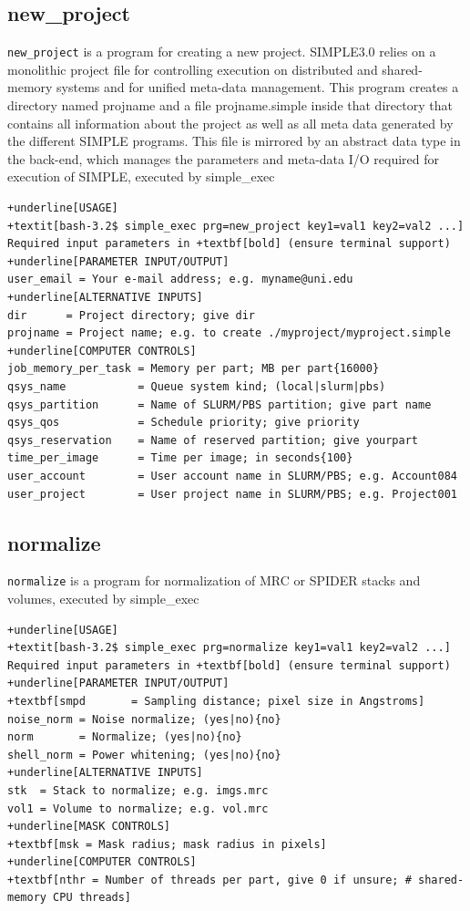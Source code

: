 \documentclass[a4paper,11pt]{article}
\newcommand{\prgname}[1]{\textcolor{NavyBlue}{\texttt{#1}}}
\begin{document}
\subsection{new\_project}
\label{new_project}
\prgname{new\_project} is a program for creating a new project. SIMPLE3.0 relies on a monolithic project file for controlling execution on distributed and shared-memory systems and for unified meta-data management. This program creates a directory named projname and a file projname.simple inside that directory that contains all information about the project as well as all meta data generated by the different SIMPLE programs. This file is mirrored by an abstract data type in the back-end, which manages the parameters and meta-data I/O required for execution of SIMPLE, executed by simple\_exec
\begin{Verbatim}[commandchars=+\[\],fontsize=\small,breaklines=true]
+underline[USAGE]
+textit[bash-3.2$ simple_exec prg=new_project key1=val1 key2=val2 ...]
Required input parameters in +textbf[bold] (ensure terminal support)
+underline[PARAMETER INPUT/OUTPUT]
user_email = Your e-mail address; e.g. myname@uni.edu
+underline[ALTERNATIVE INPUTS]
dir      = Project directory; give dir
projname = Project name; e.g. to create ./myproject/myproject.simple
+underline[COMPUTER CONTROLS]
job_memory_per_task = Memory per part; MB per part{16000}
qsys_name           = Queue system kind; (local|slurm|pbs)
qsys_partition      = Name of SLURM/PBS partition; give part name
qsys_qos            = Schedule priority; give priority
qsys_reservation    = Name of reserved partition; give yourpart
time_per_image      = Time per image; in seconds{100}
user_account        = User account name in SLURM/PBS; e.g. Account084
user_project        = User project name in SLURM/PBS; e.g. Project001
\end{Verbatim}

\subsection{normalize}
\label{normalize}
\prgname{normalize} is a program for normalization of MRC or SPIDER stacks and volumes, executed by simple\_exec
\begin{Verbatim}[commandchars=+\[\],fontsize=\small,breaklines=true]
+underline[USAGE]
+textit[bash-3.2$ simple_exec prg=normalize key1=val1 key2=val2 ...]
Required input parameters in +textbf[bold] (ensure terminal support)
+underline[PARAMETER INPUT/OUTPUT]
+textbf[smpd       = Sampling distance; pixel size in Angstroms]
noise_norm = Noise normalize; (yes|no){no}
norm       = Normalize; (yes|no){no}
shell_norm = Power whitening; (yes|no){no}
+underline[ALTERNATIVE INPUTS]
stk  = Stack to normalize; e.g. imgs.mrc
vol1 = Volume to normalize; e.g. vol.mrc
+underline[MASK CONTROLS]
+textbf[msk = Mask radius; mask radius in pixels]
+underline[COMPUTER CONTROLS]
+textbf[nthr = Number of threads per part, give 0 if unsure; # shared-memory CPU threads]
\end{Verbatim}
\end{document}
